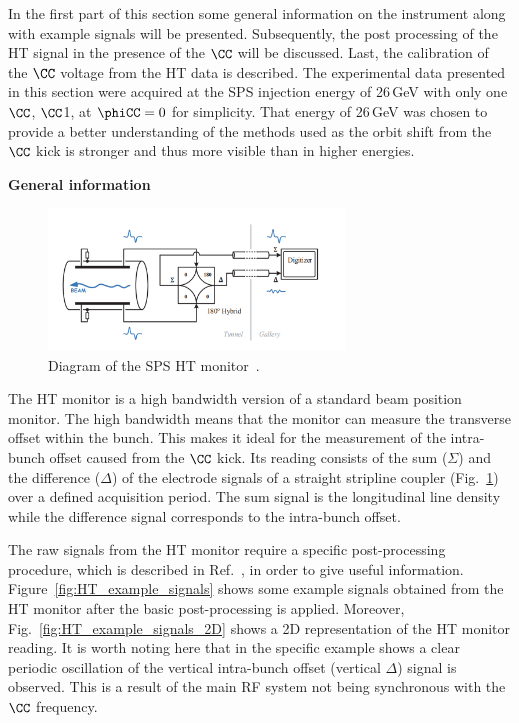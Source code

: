  In the first part of this section some general information on the instrument along with example signals will be presented. Subsequently, the post processing of the HT signal in the presence of the $\CC$ will be discussed. Last, the calibration of the $\CC$ voltage from the HT data is described. The experimental data presented in this section were acquired at the SPS injection energy of 26\,GeV with only one $\CC$, $\CC$1, at $\phiCC=0$ for simplicity. That energy of 26\,GeV was chosen to provide a better understanding of the methods used as the orbit shift from the $\CC$ kick is stronger and thus more visible than in higher energies.



\normalsize{\textbf{General information}}\\
\begin{figure}[h]
   \centering         
   \includegraphics[width=0.7\textwidth]{images/Ch4/SPS_HT_monitor_diagram_modified.png}
       \caption{Diagram of the SPS HT monitor~\cite{Levens:2313358}.}
       \label{fig:SPS_HT_diagram}
\end{figure}
The HT monitor is a high bandwidth version of a standard beam position monitor. The high bandwidth means that the monitor can measure the transverse offset within the bunch. This makes it ideal for the measurement of the intra-bunch offset caused from the $\CC$ kick. Its reading consists of the sum ($\Sigma$) and the  difference ($\Delta$) of the electrode signals of a straight stripline coupler (Fig.~\ref{fig:SPS_HT_diagram})~\cite{Jones:987561, Levens:2313358} over a defined acquisition period. The sum signal is the longitudinal line density while the difference signal corresponds to the intra-bunch offset. 

The raw signals from the HT monitor require a specific post-processing procedure, which is described in Ref.~\cite{Levens:2313358}, in order to give useful information. Figure~\ref{fig:HT_example_signals} shows some example signals obtained from the HT monitor after the basic post-processing is applied. Moreover, Fig.~\ref{fig:HT_example_signals_2D} shows a 2D representation of the HT monitor reading. It is worth noting here that in the specific example shows a clear periodic oscillation of the vertical intra-bunch offset (vertical $\Delta$) signal is observed. This is a result of the main RF system not being synchronous with the  $\CC$  frequency. 

